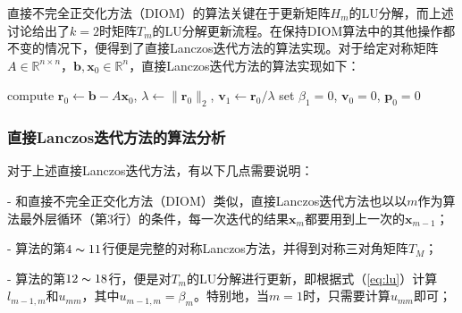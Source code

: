 \documentclass[UTF8,nofonts]{ctexart}
\begin{document}
直接不完全正交化方法（DIOM）的算法关键在于更新矩阵$H_m$的LU分解，而上述讨论给出了$k=2$时矩阵$T_m$的LU分解更新流程。在保持DIOM算法中的其他操作都不变的情况下，便得到了直接Lanczos迭代方法的算法实现。对于给定对称矩阵$A\in\mathbb{R}^{n \times n}$，$\boldsymbol{b},\boldsymbol{x}_0\in\mathbb{R}^{n}$，直接Lanczos迭代方法的算法实现如下：

\begin{algorithm}[H]
compute $\boldsymbol{r}_0\gets\boldsymbol{b}-A\boldsymbol{x}_0$, $\lambda\gets\|\boldsymbol{r}_0\|_2$, $\boldsymbol{v}_1\gets\boldsymbol{r}_0/\lambda$\;
set $\beta_1=0$, $\boldsymbol{v}_0=0$, $\boldsymbol{p}_0=0$\;
\end{algorithm}

\subsubsection*{直接Lanczos迭代方法的算法分析}

对于上述直接Lanczos迭代方法，有以下几点需要说明：

- 和直接不完全正交化方法（DIOM）类似，直接Lanczos迭代方法也以以$m$作为算法最外层循环（第$3$行）的条件，每一次迭代的结果$\boldsymbol{x}_m$都要用到上一次的$\boldsymbol{x}_{m-1}$；

- 算法的第$4\thicksim11$行便是完整的对称Lanczos方法，并得到对称三对角矩阵$T_M$；

- 算法的第$12\thicksim18$行，便是对$T_m$的LU分解进行更新，即根据式（\ref{eq:lu}）计算$l_{m-1,m}$和$u_{mm}$，其中$u_{m-1,m}=\beta_m$。特别地，当$m=1$时，只需要计算$u_{mm}$即可；
\end{document}

